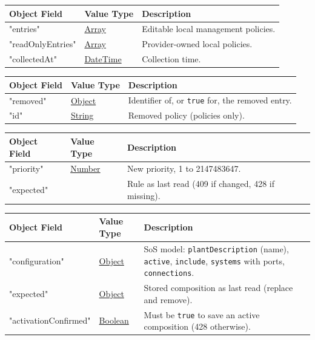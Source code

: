 \documentclass[a4paper]{arrowhead}
\newcommand{\mref}[2][]{{\textcolor{ArrowheadPurple}{\hyperref[sec:model:#2]{\ifstrempty{#1}{#2}{#1}}}}}
\newcommand{\pref}[1]{{\textcolor{ArrowheadGrey}{\hyperref[sec:model:primitives:#1]{#1}}}}
\begin{document}

\noindent\begin{tabularx}{\textwidth}{| >{\raggedright\arraybackslash}p{3.9cm} | >{\raggedright\arraybackslash\small}p{5.3cm} | X |} \hline
\rowcolor{gray!33} Object Field & Value Type & Description \\ \hline
"entries" & \pref{Array} & Editable local management policies. \\ \hline
"readOnlyEntries" & \pref{Array} & Provider-owned local policies. \\ \hline
"collectedAt" & \pref{DateTime} & Collection time. \\ \hline
\end{tabularx}



\noindent\begin{tabularx}{\textwidth}{| >{\raggedright\arraybackslash}p{3.9cm} | >{\raggedright\arraybackslash\small}p{5.3cm} | X |} \hline
\rowcolor{gray!33} Object Field & Value Type & Description \\ \hline
"removed" & \pref{Object} & Identifier of, or \texttt{true} for, the removed entry. \\ \hline
"id" & \pref{String} & Removed policy (policies only). \\ \hline
\end{tabularx}



\noindent\begin{tabularx}{\textwidth}{| >{\raggedright\arraybackslash}p{3.9cm} | >{\raggedright\arraybackslash\small}p{5.3cm} | X |} \hline
\rowcolor{gray!33} Object Field & Value Type & Description \\ \hline
"priority" & \pref{Number} & New priority, 1 to 2147483647. \\ \hline
"expected" & \mref{OrchestrationRule} & Rule as last read (409 if changed, 428 if missing). \\ \hline
\end{tabularx}



\noindent\begin{tabularx}{\textwidth}{| >{\raggedright\arraybackslash}p{3.9cm} | >{\raggedright\arraybackslash\small}p{5.3cm} | X |} \hline
\rowcolor{gray!33} Object Field & Value Type & Description \\ \hline
"configuration" & \pref{Object} & SoS model: \texttt{plantDescription} (name), \texttt{active}, \texttt{include}, \texttt{systems} with ports, \texttt{connections}. \\ \hline
"expected" & \pref{Object} & Stored composition as last read (replace and remove). \\ \hline
"activationConfirmed" & \pref{Boolean} & Must be \texttt{true} to save an active composition (428 otherwise). \\ \hline
\end{tabularx}
\end{document}
